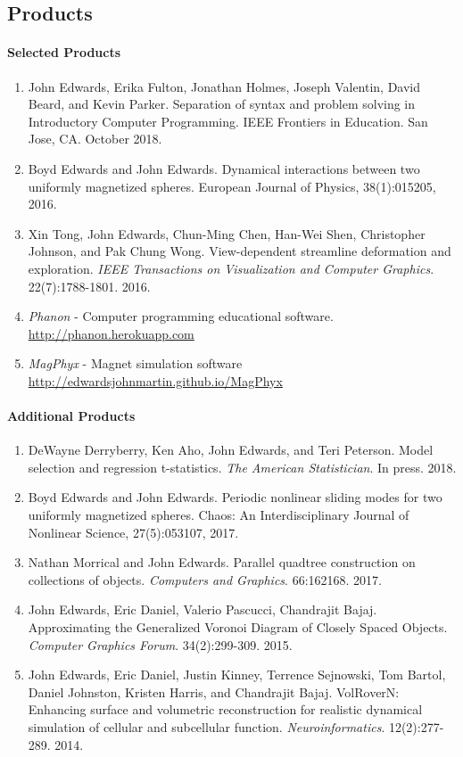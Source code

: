 \documentclass[svgnames,12pt]{article}
\newenvironment{tightenumerate}{
\begin{enumerate}
  \setlength{\itemsep}{1pt}
  \setlength{\parskip}{0pt}
  \setlength{\parsep}{0pt}
}{\end{enumerate}
}
\begin{document}
\subsection*{Products}
\paragraph{Selected Products}
\begin{tightenumerate}
\item John Edwards, Erika Fulton, Jonathan Holmes, Joseph Valentin, David Beard, and Kevin Parker. Separation of syntax and problem solving in Introductory Computer Programming. IEEE Frontiers in Education. San Jose, CA. October 2018.
\item Boyd Edwards and John Edwards. Dynamical interactions between two uniformly magnetized spheres. European Journal of Physics, 38(1):015205, 2016.
\item Xin Tong, John Edwards, Chun-Ming Chen, Han-Wei Shen, Christopher Johnson, and Pak Chung Wong. View-dependent streamline deformation and exploration. \textit{IEEE Transactions on Visualization and Computer Graphics}. 22(7):1788-1801. 2016.
\item \emph{Phanon} - Computer programming educational software.\\
\url{http://phanon.herokuapp.com}
\item \emph{MagPhyx} - Magnet simulation software\\
\url{http://edwardsjohnmartin.github.io/MagPhyx}
\end{tightenumerate}

\newpage

\paragraph{Additional Products}
\begin{tightenumerate}
\item DeWayne Derryberry, Ken Aho, John Edwards, and Teri Peterson. Model selection and regression t-statistics. \textit{The American Statistician}. In press. 2018.
\item Boyd Edwards and John Edwards. Periodic nonlinear sliding modes for two uniformly magnetized spheres. Chaos: An Interdisciplinary Journal of Nonlinear Science, 27(5):053107, 2017.
\item Nathan Morrical and John Edwards. Parallel quadtree construction on collections of objects. \textit{Computers and Graphics}. 66:162168. 2017.
\item John Edwards, Eric Daniel, Valerio Pascucci, Chandrajit Bajaj. Approximating the Generalized Voronoi Diagram of Closely Spaced Objects. \textit{Computer Graphics Forum}. 34(2):299-309. 2015.
\item John Edwards, Eric Daniel, Justin Kinney, Terrence Sejnowski, Tom Bartol, Daniel Johnston, Kristen Harris, and Chandrajit Bajaj. VolRoverN: Enhancing surface and volumetric reconstruction for realistic dynamical simulation of cellular and subcellular function.  \textit{Neuroinformatics}. 12(2):277-289.  2014.
\end{tightenumerate}
\end{document}
